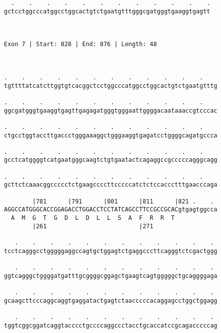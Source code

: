 \documentclass{article}
\begin{document}
\begin{Verbatim}
  .    .    .    .    .    .    .    .    .    .    .    .
gctcctggcccatggcctggcactgtctgaatgtttgggcgatgggtgaaggtgagtt
                                                          
                                                          
 
Exon 7 | Start: 828 | End: 876 | Length: 48



.    .    .    .    .    .    .    .    .    .    .    .    
tgttttatcatcttggtgtcacggctcctggcccatggcctggcactgtctgaatgtttg
                                                            
.    .    .    .    .    .    .    .    .    .    .    .    
ggcgatgggtgaaggtgagttgagagatgggtgggaattggggacaataaaccgtcccac
                                                            
.    .    .    .    .    .    .    .    .    .    .    .    
ctgcctggtaccttgaccctgggaaaggctgggaaggtgagatcctggggcagatgccca
                                                            
.    .    .    .    .    .    .    .    .    .    .    .    
gcctcatggggtcatgaatgggcaagtctgtgaatactcagaggccgcccccagggcagg
                                                            
.    .    .    .    .    .    .    .    .    .    .    .    
gcttctcaaacggccccctctgaagccccttcccccatctctccaccctttgaacccaga
                                                            
        |781      |791      |801      |811      |821 .    . 
AGGCCATGGGCACCGGAGACCTGGACCTCCTATCAGCCTTCCGCCGCACgtgagtggcca
  A  M  G  T  G  D  L  D  L  L  S  A  F  R  R  T            
        |261                          |271                  
  
   .    .    .    .    .    .    .    .    .    .    .    . 
tcctcagggcctgggggaggccagtgctggagtctgaggcccttcagggtctcgactggg
                                                            
   .    .    .    .    .    .    .    .    .    .    .    . 
ggtcagggctggggatgatttgcggggcggagctgaagtcagtgggggctgcaggggaga
                                                            
   .    .    .    .    .    .    .    .    .    .    .    . 
gcaagcttcccaggcaggtgaggatactgagtctaacccccacaggagcctggctggagg
                                                            
   .    .    .    .    .    .    .    .    .    .    .    . 
tggtcggcggatcaggtacccctgccccaggccctacctgcaccatccgcagacccccag
                                                            

\end{Verbatim}
\end{document}
